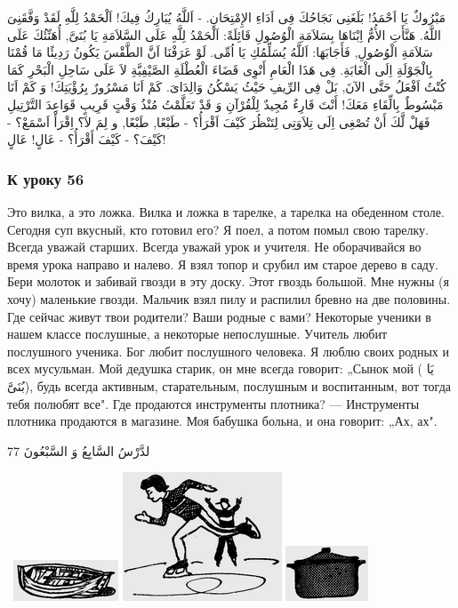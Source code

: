 \documentclass[a5paper]{article}
\begin{document}
مَبْرُوكٌ يَا اَحْمَدُ! بَلَغَنِى نَجَاحُكَ فِى اَدَاءِ الإِمْتِحَانِ. - اَللَّهُ يُبَارِكُ فِيكَ! اَلْحَمْدُ لِلَّهِ لَقَدْ وَفَّقَنِىَ اللَّهُ. هَنَّأَتِ الأُمُّ اِبْنَاهَا بِسَلاَمَةِ الْوُصُولِ قَائِلَةً: اَلْحَمْدُ لِلَّهِ عَلَى السَّلاَمَةِ يَا بُنَىَّ, أُهَنِّئُكَ عَلَى سَلاَمَةِ الْوُصُولِ, فَأَجَابَهَا: اَللَّهُ يُسَلِّمُكِ يَا اُمِّى. لَوْ عَرَفْنَا اَنَّ الطَّقْسَ يَكُونُ رَدِيئًا مَا قُمْنَا بِالْجَوْلَةِ اِلَى الْغَابَةِ. فِى هَذَا الْعَامِ أَنْوِى قَضَاءَ الْعُطْلَةِ الصَّيْفِيَّةِ لاَ عَلَى سَاحِلِ الْبَحْرِ كَمَا كُنْتُ اَفْعَلُ حَتَّى الآنَ, بَلْ فِى الرِّيفِ حَيْثُ يَسْكُنُ وَالِدَاىَ. كَمْ اَنَا مَسْرُورٌ بِرُؤْيَتِكَ! وَ كَمْ اَنَا مَبْسُوطٌ بِالِّقَاءِ مَعَكَ! أَنْتَ قَارِءٌ مُجِيدٌ لِلْقُرْآنِ وَ قَدْ تَعَلَّمْتُ مُنْذُ وَقْتٍ قَرِيبٍ قَوَاعِدَ التَّرْتِيلِ فَهَلْ لَّكَ أَنْ تُصْغِى اِلَى تِلاَوَتِى لِتَنْظُرَ كَيْفَ اَقْرَأُ؟ - طَبْعًا, طَبْعًا, و لِمَ لاَ؟ اِقْرَأْ اَسْمَعْ؟ - كَيْفَ؟ - كَيْفَ أَقْرَأُ؟ - عَالٍ! عَالٍ! 

\subsubsection{К уроку 56}
Это вилка, а это ложка. Вилка и ложка в тарелке, а тарелка на обеденном столе. Сегодня суп вкусный, кто готовил его? Я поел, а потом помыл свою тарелку. Всегда уважай старших. Всегда уважай урок и учителя. Не оборачивайся во время урока направо и налево. Я взял топор и срубил им старое дерево в саду. Бери молоток и забивай гвозди в эту доску. Этот гвоздь большой. Мне нужны (я хочу) маленькие гвозди. Мальчик взял пилу и распилил бревно на две половины. Где сейчас живут твои родители? Ваши родные с вами? Некоторые ученики в нашем классе послушные, а некоторые непослушные. Учитель любит послушного ученика. Бог любит послушного человека. Я люблю своих родных и всех мусульман. Мой дедушка старик, он мне всегда говорит: „Сынок мой ( يَا بُنَىَّ), будь всегда активным, старательным, послушным и воспитанным, вот тогда тебя полюбят все". Где продаются инструменты плотника? — Инструменты плотника продаются в магазине. Моя бабушка больна, и она говорит: „Ах, ах".

لدَّرْسُ السَّابِعُ وَ السَّبْعُونَ 77

\  \includegraphics[width=1.2291in,height=0.4791in]{MuhammadBagauddinlatinized-img226.png}   \includegraphics[width=1.8646in,height=1.5102in]{MuhammadBagauddinlatinized-img227.png}   \includegraphics[width=0.9689in,height=0.6457in]{MuhammadBagauddinlatinized-img228.png} 
\end{document}
